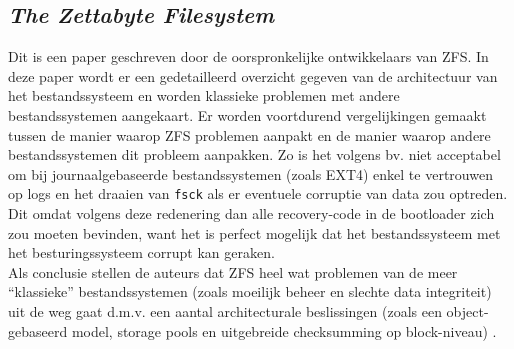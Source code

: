 \documentclass[fleqn,10pt]{voorstel}
\begin{document}




\subsection{\textit{The Zettabyte Filesystem} \autocite{ZFSBonwick}}

Dit is een paper geschreven door de oorspronkelijke ontwikkelaars van ZFS. In deze paper wordt er een gedetailleerd overzicht gegeven van de architectuur van het bestandssysteem en worden klassieke problemen met andere bestandssystemen aangekaart. Er worden voortdurend vergelijkingen gemaakt tussen de manier waarop ZFS problemen aanpakt en de manier waarop andere bestandssystemen dit probleem aanpakken. Zo is het volgens \textcite{ZFSBonwick} bv. niet acceptabel om bij journaalgebaseerde bestandssystemen (zoals EXT4) enkel te vertrouwen op logs en het draaien van \texttt{fsck} als er eventuele corruptie van data zou optreden. Dit omdat volgens deze redenering dan alle recovery-code in de bootloader zich zou moeten bevinden, want het is perfect mogelijk dat het bestandssysteem met het besturingssysteem corrupt kan geraken. \\
Als conclusie stellen de auteurs dat ZFS heel wat problemen van de meer ``klassieke'' bestandssystemen (zoals moeilijk beheer en slechte data integriteit) uit de weg gaat d.m.v. een aantal architecturale beslissingen (zoals een object-gebaseerd model, storage pools en uitgebreide checksumming op block-niveau) \autocite{ZFSBonwick}.
\end{document}
